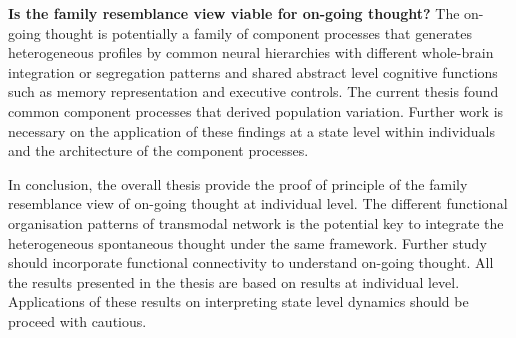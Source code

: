 \textbf{Is the family resemblance view viable for on-going thought?} The on-going thought is potentially a family of component processes that generates heterogeneous profiles by common neural hierarchies with different whole-brain integration or segregation patterns and shared abstract level cognitive functions such as memory representation and executive controls. The current thesis found common component processes that derived population variation. Further work is necessary on the application of these findings at a state level within individuals and the architecture of the component processes. 

In conclusion, the overall thesis provide the proof of principle of the family resemblance view of on-going thought at individual level. The different functional organisation patterns of transmodal network is the potential key to integrate the heterogeneous spontaneous thought under the same framework. Further study should incorporate functional connectivity to understand on-going thought. All the results presented in the thesis are based on results at individual level. Applications of these results on interpreting state level dynamics should be proceed with cautious. 